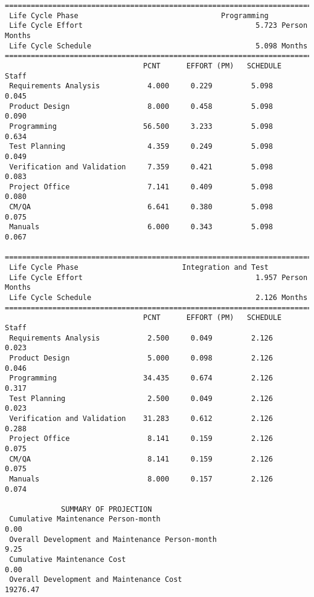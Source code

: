 \documentclass[11pt,a4paper,spanish,twoside]{report}
\begin{document}
{\begin{verbatim}
==============================================================================
 Life Cycle Phase                                 Programming
 Life Cycle Effort                                        5.723 Person Months
 Life Cycle Schedule                                      5.098 Months
==============================================================================
                                PCNT      EFFORT (PM)   SCHEDULE       Staff   
 Requirements Analysis           4.000     0.229         5.098        0.045
 Product Design                  8.000     0.458         5.098        0.090
 Programming                    56.500     3.233         5.098        0.634
 Test Planning                   4.359     0.249         5.098        0.049
 Verification and Validation     7.359     0.421         5.098        0.083
 Project Office                  7.141     0.409         5.098        0.080
 CM/QA                           6.641     0.380         5.098        0.075
 Manuals                         6.000     0.343         5.098        0.067

==============================================================================
 Life Cycle Phase                        Integration and Test
 Life Cycle Effort                                        1.957 Person Months
 Life Cycle Schedule                                      2.126 Months
==============================================================================
                                PCNT      EFFORT (PM)   SCHEDULE       Staff   
 Requirements Analysis           2.500     0.049         2.126        0.023
 Product Design                  5.000     0.098         2.126        0.046
 Programming                    34.435     0.674         2.126        0.317
 Test Planning                   2.500     0.049         2.126        0.023
 Verification and Validation    31.283     0.612         2.126        0.288
 Project Office                  8.141     0.159         2.126        0.075
 CM/QA                           8.141     0.159         2.126        0.075
 Manuals                         8.000     0.157         2.126        0.074

             SUMMARY OF PROJECTION
 Cumulative Maintenance Person-month                                 0.00
 Overall Development and Maintenance Person-month                    9.25
 Cumulative Maintenance Cost                                         0.00
 Overall Development and Maintenance Cost                        19276.47

\end{verbatim}
}
\end{document}
